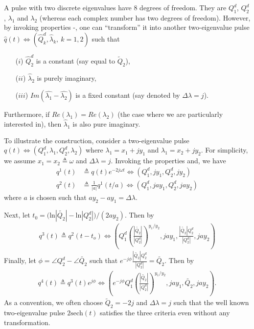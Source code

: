 \documentclass[9pt,twocolumn,twoside]{osajnl}
\begin{document}
A pulse with two discrete eigenvalues have 8 degrees of freedom. They are $Q^d_1$, $Q^d_2$, $\lambda_1$ and $\lambda_2$ (whereas each complex number has two degrees of freedom). However, by invoking properties -, one can ``transform'' it into another two-eigenvalue pulse $\hat{q}(t)\Leftrightarrow (\hat{Q}_k^d,\hat{\lambda}_k,\:k=1,2)$ such that
\begin{itemize}[topsep=0pt,itemsep=0pt,partopsep=0pt,parsep=0pt]
    \item[($i$)] $\hat{Q}_2^d $ is a constant (say equal to $\widetilde{Q}_2$), 
    \item[($ii$)] $\hat{\lambda}_2$ is purely imaginary,
    \item[($iii$)] $Im(\hat{\lambda_1}-\hat{\lambda_2})$ is a fixed constant (say denoted by $\Delta\lambda=j$).
\end{itemize}
Furthermore, if $Re(\lambda_1)=Re(\lambda_2)$ (the case where we are particularly interested in), then $\hat{\lambda}_1$ is also pure imaginary. 

To illustrate the construction, consider a two-eigenvalue pulse $q(t) \Leftrightarrow (Q_1^d,\lambda_1,Q_2^d,\lambda_2)$ where $\lambda_1=x_1+jy_1$ and $\lambda_1=x_2+jy_2$. For simplicity, we assume $x_1=x_2\triangleq\omega$ and $\Delta\lambda=j$. Invoking the properties  and, we have
\begin{align}
q^1(t) & \triangleq q(t)e^{-2j\omega t} \Leftrightarrow (Q_1^d,jy_1,Q_2^d,jy_2)   \\ \nonumber
q^2(t) & \triangleq  \frac{1}{|a|}q^1(t/a) \Leftrightarrow (Q_1^d,jay_1,Q_2^d,jay_2) \nonumber
\end{align}
where $a$ is chosen such that $ay_2-ay_1=\Delta\lambda$.

Next, let $t_0={(\text{ln}|\widetilde{Q_2}|-\text{ln}|Q^d_2|})/{(2a y_2 )}$. Then by 
\begin{align*}
	q^3(t) \triangleq q^2(t-t_o) \Leftrightarrow \left(Q^d_1\left( \frac{|\widetilde{Q_2}|}{|Q_2^d|}\right)^{y_1/y_2},jay_1,\frac{|\widetilde{Q_2}|Q_2^d}{|Q_2^d|},jay_2\right)
\end{align*}
Finally, let $\phi=\angle{Q_2^d}-\angle\widetilde{Q_2}$ such that $e^{-j\phi}\frac{|\widetilde{Q_2}|Q_2^d}{|Q_2^d|}=\widetilde{Q_2}$. Then by 
\begin{align*}
    q^4(t) \triangleq q^3(t)e^{j\phi} \Leftrightarrow \left(e^{-j\phi}Q^d_1\left(\frac{|\widetilde{Q_2}|}{|Q_2^d|}\right)^{y_1/y_2},jay_1,\widetilde{Q_2},jay_2\right).
\end{align*}
As a convention, we often choose $\widetilde{Q}_2=-2j$ and $\Delta\lambda=j$ such that the well known two-eigenvalue pulse $2\text{sech}(t)$ satisfies the three criteria even without any transformation.
\end{document}
